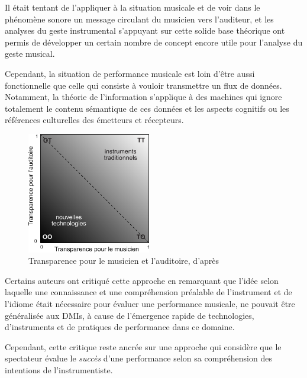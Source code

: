 Il était tentant de l'appliquer à la situation musicale et de voir dans le phénomène sonore un message circulant du musicien vers l'auditeur, et les analyses du geste instrumental s'appuyant sur cette solide base théorique ont permis de développer un certain nombre de concept encore utile pour l'analyse du geste musical.

Cependant, la situation de performance musicale est loin d'être aussi fonctionnelle que celle qui consiste à vouloir transmettre un flux de données. Notamment, la théorie de l'information s'applique à des machines qui ignore totalement le contenu sémantique de ces données et les aspects cognitifs ou les références culturelles des émetteurs et récepteurs.
\begin{figure}
	\begin{center}
 		\includegraphics[width=0.48\textwidth]{gfx/03_gesture/Fels-transparency.pdf}
	\end{center}
	\caption{Transparence pour le musicien et l'auditoire, d'après \cite{fels_mapping_2002}}
	\label{fig:gesture:fels_transparency}
\end{figure}

Certains auteurs ont critiqué cette approche \cite{fyans_where_2009} en remarquant que l'idée selon laquelle une connaissance et une compréhension préalable de l'instrument et de l'idiome était nécessaire pour évaluer une performance musicale, ne pouvait être généralisée aux \glspl{DMI}, à cause de l'émergence rapide de technologies, d'instruments et de pratiques de performance dans ce domaine. 

Cependant, cette critique reste ancrée sur une approche qui considère que le spectateur évalue le \textit{succès} d'une performance selon sa compréhension des intentions de l'instrumentiste.


